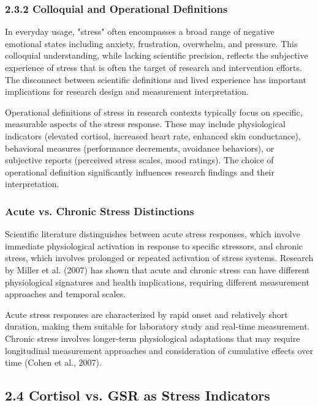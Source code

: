 \documentclass[12pt,a4paper]{article}
\begin{document}
\subsubsection{2.3.2 Colloquial and Operational Definitions}

In everyday usage, "stress" often encompasses a broad range of negative emotional states including anxiety, frustration,
overwhelm, and pressure. This colloquial understanding, while lacking scientific precision, reflects the subjective
experience of stress that is often the target of research and intervention efforts. The disconnect between scientific
definitions and lived experience has important implications for research design and measurement interpretation.

Operational definitions of stress in research contexts typically focus on specific, measurable aspects of the stress
response. These may include physiological indicators (elevated cortisol, increased heart rate, enhanced skin
conductance), behavioral measures (performance decrements, avoidance behaviors), or subjective reports (perceived stress
scales, mood ratings). The choice of operational definition significantly influences research findings and their
interpretation.

\subsubsection{Acute vs. Chronic Stress Distinctions}

Scientific literature distinguishes between acute stress responses, which involve immediate physiological activation in
response to specific stressors, and chronic stress, which involves prolonged or repeated activation of stress systems.
Research by Miller et al. (2007) has shown that acute and chronic stress can have different physiological signatures and
health implications, requiring different measurement approaches and temporal scales.

Acute stress responses are characterized by rapid onset and relatively short duration, making them suitable for
laboratory study and real-time measurement. Chronic stress involves longer-term physiological adaptations that may
require longitudinal measurement approaches and consideration of cumulative effects over time (Cohen et al., 2007).

\subsection{2.4 Cortisol vs. GSR as Stress Indicators}
\end{document}
